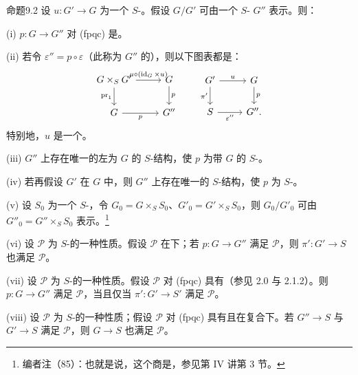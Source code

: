 \begin{SGAresult}{命题}{9.2}
设 $u:G'\to G$ 为一个 $S$-。假设 $G/G'$ 可由一个 $S$- $G''$ 表示。则：

(i)  $p:G\to G''$ 对 (fpqc) 是。

(ii) 若令 $\varepsilon''=p\circ\varepsilon$（此称为 $G''$ 的），则以下图表都是：
\[
\begin{tikzcd}
G\times_S G'\arrow[r,"\mu\circ(\operatorname{id}_G\times u)"]\arrow[d,"\operatorname{pr}_1"']&G\arrow[d,"p"]\\
G\arrow[r,"p"']&G''
\end{tikzcd}
\qquad
\begin{tikzcd}
G'\arrow[r,"u"]\arrow[d,"\pi'"']&G\arrow[d,"p"]\\
S\arrow[r,"\varepsilon''"']&G''.
\end{tikzcd}
\]
特别地，$u$ 是一个。

(iii) $G''$ 上存在唯一的左为 $G$ 的 $S$-结构，使 $p$ 为带 $G$ 的 $S$-。

(iv) 若再假设 $G'$ 在 $G$ 中，则 $G''$ 上存在唯一的 $S$-结构，使 $p$ 为 $S$-。

(v) 设 $S_0$ 为一个 $S$-，令 $G_0=G\times_S S_0$、$G'_0=G'\times_S S_0$，则 $G_0/G'_0$ 可由 $G''_0=G''\times_S S_0$ 表示。\footnote{编者注（85）：也就是说，这个商是，参见第 IV 讲第 3 节。}

(vi) 设 $\mathscr P$ 为 $S$-的一种性质。假设 $\mathscr P$ 在下；若 $p:G\to G''$ 满足 $\mathscr P$，则 $\pi':G'\to S$ 也满足 $\mathscr P$。

(vii) 设 $\mathscr P$ 为 $S$-的一种性质。假设 $\mathscr P$ 对 (fpqc) 具有（参见 2.0 与 2.1.2）。则 $p:G\to G''$ 满足 $\mathscr P$，当且仅当 $\pi':G'\to S'$ 满足 $\mathscr P$。

(viii) 设 $\mathscr P$ 为 $S$-的一种性质；假设 $\mathscr P$ 对 (fpqc) 具有且在复合下。若 $G''\to S$ 与 $G'\to S$ 满足 $\mathscr P$，则 $G\to S$ 也满足 $\mathscr P$。


\end{SGAresult}
